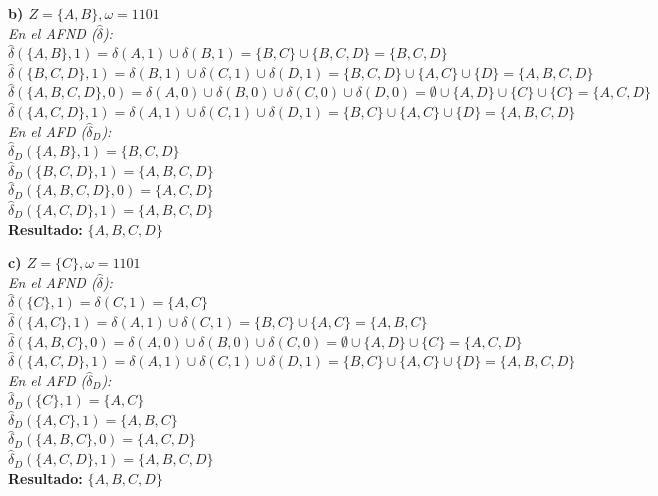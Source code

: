 \documentclass[12pt]{article}
\begin{document}
\begin{center}
\begin{minipage}{0.45\textwidth}
\end{minipage}
\hfill
\begin{minipage}{0.45\textwidth}

\vspace{0.2cm}
\textbf{b) $Z = \{A, B\}, \omega = 1101$} \\
\textit{En el AFND ($\hat{\delta}$):} \\
$\hat{\delta}(\{A, B\}, 1) = \delta(A, 1) \cup \delta(B, 1) = \{B, C\} \cup \{B, C, D\} = \{B, C, D\}$ \\
$\hat{\delta}(\{B, C, D\}, 1) = \delta(B, 1) \cup \delta(C, 1) \cup \delta(D, 1) = \{B, C, D\} \cup \{A, C\} \cup \{D\} = \{A, B, C, D\}$ \\
$\hat{\delta}(\{A, B, C, D\}, 0) = \delta(A, 0) \cup \delta(B, 0) \cup \delta(C, 0) \cup \delta(D, 0) = \emptyset \cup \{A, D\} \cup \{C\} \cup \{C\} = \{A, C, D\}$ \\
$\hat{\delta}(\{A, C, D\}, 1) = \delta(A, 1) \cup \delta(C, 1) \cup \delta(D, 1) = \{B, C\} \cup \{A, C\} \cup \{D\} = \{A, B, C, D\}$ \\
\textit{En el AFD ($\hat{\delta}_D$):} \\
$\hat{\delta}_D(\{A, B\}, 1) = \{B, C, D\}$ \\
$\hat{\delta}_D(\{B, C, D\}, 1) = \{A, B, C, D\}$ \\
$\hat{\delta}_D(\{A, B, C, D\}, 0) = \{A, C, D\}$ \\
$\hat{\delta}_D(\{A, C, D\}, 1) = \{A, B, C, D\}$ \\
\textbf{Resultado:} $\{A, B, C, D\}$

\vspace{0.2cm}
\textbf{c) $Z = \{C\}, \omega = 1101$} \\
\textit{En el AFND ($\hat{\delta}$):} \\
$\hat{\delta}(\{C\}, 1) = \delta(C, 1) = \{A, C\}$ \\
$\hat{\delta}(\{A, C\}, 1) = \delta(A, 1) \cup \delta(C, 1) = \{B, C\} \cup \{A, C\} = \{A, B, C\}$ \\
$\hat{\delta}(\{A, B, C\}, 0) = \delta(A, 0) \cup \delta(B, 0) \cup \delta(C, 0) = \emptyset \cup \{A, D\} \cup \{C\} = \{A, C, D\}$ \\
$\hat{\delta}(\{A, C, D\}, 1) = \delta(A, 1) \cup \delta(C, 1) \cup \delta(D, 1) = \{B, C\} \cup \{A, C\} \cup \{D\} = \{A, B, C, D\}$ \\
\textit{En el AFD ($\hat{\delta}_D$):} \\
$\hat{\delta}_D(\{C\}, 1) = \{A, C\}$ \\
$\hat{\delta}_D(\{A, C\}, 1) = \{A, B, C\}$ \\
$\hat{\delta}_D(\{A, B, C\}, 0) = \{A, C, D\}$ \\
$\hat{\delta}_D(\{A, C, D\}, 1) = \{A, B, C, D\}$ \\
\textbf{Resultado:} $\{A, B, C, D\}$
\end{minipage}


\end{center}
\end{document}
